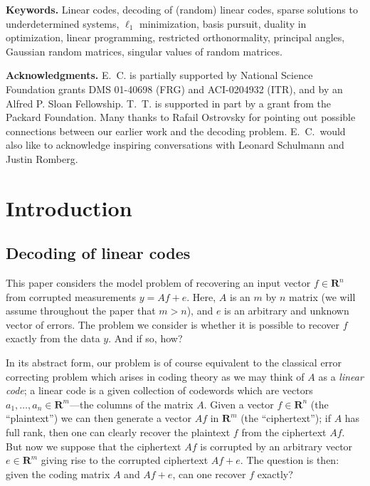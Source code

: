 \documentclass[11pt]{article}
\def\R{{{\mathbf{R}}}} %
\def\emph#1{{\it #1}} \def\textbf#1{{\bf #1}}
\newcommand{\<}{\langle}
\renewcommand{\>}{\rangle}
\numberwithin{equation}{section}
\begin{document}
{\bf Keywords.}  Linear codes, decoding of (random) linear codes,
sparse solutions to underdetermined systems, $\ell_1$ minimization,
basis pursuit, duality in optimization, linear programming, restricted
orthonormality, principal angles, Gaussian random matrices, singular
values of random matrices.

{\bf Acknowledgments.} E.~C. is partially supported by National
Science Foundation grants DMS 01-40698 (FRG) and ACI-0204932 (ITR),
and by an Alfred P.  Sloan Fellowship. T.~T. is supported in part by a
grant from the Packard Foundation.  Many thanks to Rafail Ostrovsky
for pointing out possible connections between our earlier work and the
decoding problem.  E.~C.~would also like to acknowledge inspiring
conversations with Leonard Schulmann and Justin Romberg.


\pagebreak


\section{Introduction}
\label{sec:introduction}

\subsection{Decoding of linear codes}

This paper considers the model problem of recovering an input vector
$f \in \R^n$ from corrupted measurements $y = A f + e$. Here, $A$ is
an $m$ by $n$ matrix (we will assume throughout the paper that $m >
n$), and $e$ is an arbitrary and unknown vector of errors. The problem
we consider is whether it is possible to recover $f$ exactly from the
data $y$. And if so, how? 

In its abstract form, our problem is of course equivalent to the
classical error correcting problem which arises in coding theory as we
may think of $A$ as a \emph{linear code}; a linear code is a given
collection of codewords which are vectors $a_1,\ldots, a_n \in
\R^m$---the columns of the matrix $A$. Given a vector $f \in \R^n$ (the
``plaintext'') we can then generate a vector $Af$ in $\R^m$ (the
``ciphertext''); if $A$ has full rank, then one can clearly recover
the plaintext $f$ from the ciphertext $Af$. But now we suppose that
the ciphertext $Af$ is corrupted by an arbitrary vector $e \in \R^m$
giving rise to the corrupted ciphertext $Af+e$.  The question is then:
given the coding matrix $A$ and $Af+e$, can one recover $f$ exactly?
\end{document}
